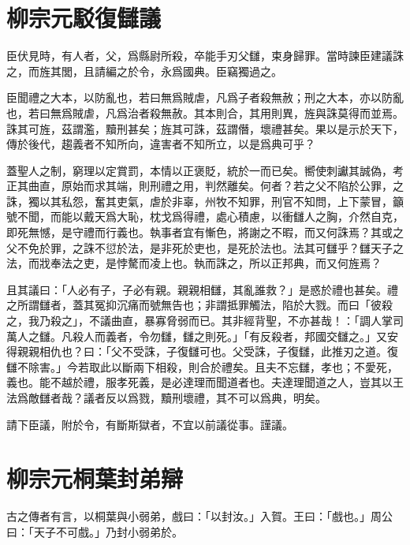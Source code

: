 \section[駁復讎議\quad{\small 柳宗元}]{{\normalsize 柳宗元}\quad 駁復讎議}
臣伏見時，有人者，父，爲縣尉所殺，卒能手刃父讎，束身歸罪。當時諫臣建議誅之，而旌其閭，且請編之於令，永爲國典。臣竊獨過之。

臣聞禮之大本，以防亂也，若曰無爲賊虐，凡爲子者殺無赦；刑之大本，亦以防亂也，若曰無爲賊虐，凡爲治者殺無赦。其本則合，其用則異，旌與誅莫得而並焉。誅其可旌，茲謂濫，黷刑甚矣；旌其可誅，茲謂僭，壞禮甚矣。果以是示於天下，傳於後代，趨義者不知所向，違害者不知所立，以是爲典可乎？

蓋聖人之制，窮理以定賞罰，本情以正褒貶，統於一而已矣。嚮使刺讞其誠偽，考正其曲直，原始而求其端，則刑禮之用，判然離矣。何者？若之父不陷於公罪，之誅，獨以其私怨，奮其吏氣，虐於非辜，州牧不知罪，刑官不知問，上下蒙冒，籲號不聞，而能以戴天爲大恥，枕戈爲得禮，處心積慮，以衝讎人之胸，介然自克，即死無憾，是守禮而行義也。執事者宜有慚色，將謝之不暇，而又何誅焉？其或之父不免於罪，之誅不愆於法，是非死於吏也，是死於法也。法其可讎乎？讎天子之法，而戕奉法之吏，是悖驁而凌上也。執而誅之，所以正邦典，而又何旌焉？

且其議曰：「人必有子，子必有親。親親相讎，其亂誰救？」是惑於禮也甚矣。禮之所謂讎者，蓋其冤抑沉痛而號無告也；非謂抵罪觸法，陷於大戮。而曰「彼殺之，我乃殺之」，不議曲直，暴寡脅弱而已。其非經背聖，不亦甚哉！：「調人掌司萬人之讎。凡殺人而義者，令勿讎，讎之則死。」「有反殺者，邦國交讎之。」又安得親親相仇也？曰：「父不受誅，子復讎可也。父受誅，子復讎，此推刃之道。復讎不除害。」今若取此以斷兩下相殺，則合於禮矣。且夫不忘讎，孝也；不愛死，義也。能不越於禮，服孝死義，是必達理而聞道者也。夫達理聞道之人，豈其以王法爲敵讎者哉？議者反以爲戮，黷刑壞禮，其不可以爲典，明矣。

請下臣議，附於令，有斷斯獄者，不宜以前議從事。謹議。

\section[桐葉封弟辯\quad{\small 柳宗元}]{{\normalsize 柳宗元}\quad 桐葉封弟辯}
古之傳者有言，以桐葉與小弱弟，戲曰：「以封汝。」入賀。王曰：「戲也。」周公曰：「天子不可戲。」乃封小弱弟於。

